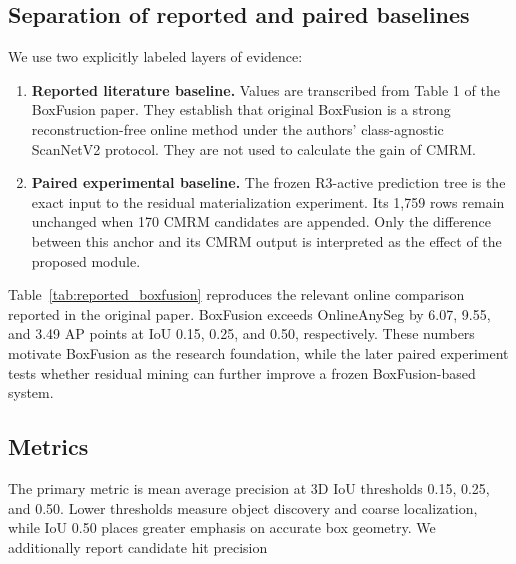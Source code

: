 \documentclass[11pt,a4paper]{article}
\begin{document}
\subsection{Separation of reported and paired baselines}
We use two explicitly labeled layers of evidence:

\begin{enumerate}[leftmargin=2.2em]
\item \textbf{Reported literature baseline.} Values are transcribed from Table 1 of the BoxFusion paper. They establish that original BoxFusion is a strong reconstruction-free online method under the authors' class-agnostic ScanNetV2 protocol. They are not used to calculate the gain of CMRM.
\item \textbf{Paired experimental baseline.} The frozen R3-active prediction tree is the exact input to the residual materialization experiment. Its 1,759 rows remain unchanged when 170 CMRM candidates are appended. Only the difference between this anchor and its CMRM output is interpreted as the effect of the proposed module.
\end{enumerate}
Table~\ref{tab:reported_boxfusion} reproduces the relevant online comparison reported in the original paper. BoxFusion exceeds OnlineAnySeg by 6.07, 9.55, and 3.49 AP points at IoU 0.15, 0.25, and 0.50, respectively. These numbers motivate BoxFusion as the research foundation, while the later paired experiment tests whether residual mining can further improve a frozen BoxFusion-based system.

\begin{table}[H]
\centering
\small
\caption{Results reported by the original BoxFusion paper on 100 ScanNetV2 validation scenes under its class-agnostic protocol.}
\label{tab:reported_boxfusion}
\end{table}
\subsection{Metrics}
The primary metric is mean average precision at 3D IoU thresholds 0.15, 0.25, and 0.50. Lower thresholds measure object discovery and coarse localization, while IoU 0.50 places greater emphasis on accurate box geometry. We additionally report candidate hit precision
\end{document}
